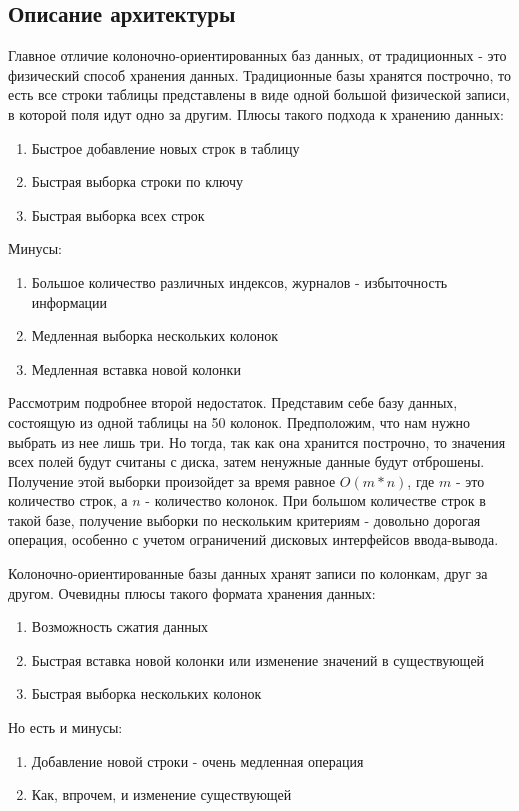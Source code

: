 \documentclass{matmex-diploma}
\begin{document}
\subsection{Описание архитектуры}
    Главное отличие колоночно-ориентированных баз данных, от традиционных - это физический способ хранения данных. Традиционные базы хранятся построчно, то есть все строки таблицы представлены в виде одной большой физической записи, в которой поля идут одно за другим. %
    Плюсы такого подхода к хранению данных:
    \begin{enumerate}\itemsep1pt \parskip0pt 
        \item Быстрое добавление новых строк в таблицу
        \item Быстрая выборка строки по ключу
        \item Быстрая выборка всех строк
    \end{enumerate}
    Минусы:
    \begin{enumerate}\itemsep1pt \parskip0pt 
        \item Большое количество различных индексов, журналов - избыточность информации
        \item Медленная выборка нескольких колонок
        \item Медленная вставка новой колонки
    \end{enumerate}
    Рассмотрим подробнее второй недостаток. Представим себе базу данных, состоящую из одной таблицы на 50 колонок. Предположим, что нам нужно выбрать из нее лишь три. Но тогда, так как она хранится построчно, то значения всех полей будут считаны с диска, затем ненужные данные будут отброшены. Получение этой выборки произойдет за время равное $O(m * n)$, где $m$ - это количество строк, а $n$ - количество колонок. При большом количестве строк в такой базе, получение выборки по нескольким критериям - довольно дорогая операция, особенно с учетом ограничений дисковых интерфейсов ввода-вывода.
    
    Колоночно-ориентированные базы данных хранят записи по колонкам, друг за другом.  Очевидны плюсы такого формата хранения данных: %
    \begin{enumerate}\itemsep1pt \parskip0pt 
        \item Возможность сжатия данных
        \item Быстрая вставка новой колонки или изменение значений в существующей
        \item Быстрая выборка нескольких колонок
    \end{enumerate}
    Но есть и минусы:
    \begin{enumerate}\itemsep1pt \parskip0pt 
        \item Добавление новой строки - очень медленная операция
        \item Как, впрочем, и изменение существующей
    \end{enumerate}
\end{document}
